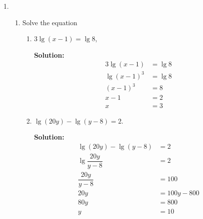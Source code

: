 \documentclass{report}
\newcommand{\sol}{\vspace{0.2cm}\textbf{Solution:}\vspace{0.2cm}}
\begin{document}
\begin{multicols*}{2}
\begin{enumerate}[leftmargin=*]
\begin{enumerate}
                  \item Find the coordinates of the stationary point of the curve $y=x e^{-x}$.

                        Draw the curve $y=x e^{-x}$ for $-1 \leq x \leq 2$ and use your graph to
                        estimale the solution of the equation $x+e^{x}=0$.

                        \sol{}

                        Lazy to draw the graph. :P
              \end{enumerate}

        \item \begin{enumerate}
                  \item Solve the equation
                        \begin{enumerate}[label=(\roman*)]
                            \item $3 \lg (x-1)=\lg 8$,

                                  \sol{}
                                  \begin{align*}
                                      3 \lg (x - 1) & = \lg 8 \\
                                      \lg (x - 1)^3 & = \lg 8 \\
                                      (x - 1)^3     & = 8     \\
                                      x - 1         & = 2     \\
                                      x             & = 3
                                  \end{align*}

                            \item $\lg (20 y)-\lg (y-8)=2$.

                                  \sol{}
                                  \begin{align*}
                                      \lg (20y) - \lg (y - 8) & = 2          \\
                                      \lg \dfrac{20y}{y - 8}  & = 2          \\
                                      \dfrac{20y}{y - 8}      & = 100        \\
                                      20y                     & = 100y - 800 \\
                                      80y                     & = 800        \\
                                      y                       & = 10
                                  \end{align*}
                        \end{enumerate}


\end{enumerate}
\end{enumerate}
\end{multicols*}
\end{document}
